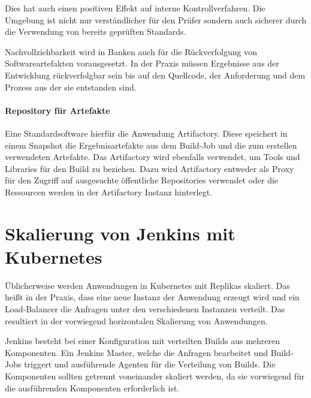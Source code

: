 Dies hat auch einen positiven Effekt auf interne Kontrollverfahren. Die Umgebung ist nicht nur verständlicher für den Prüfer sondern auch sicherer durch die Verwendung von bereits geprüften Standards.

Nachvollziehbarkeit wird in Banken auch für die Rückverfolgung von Softwareartefakten vorausgesetzt. In der Praxis müssen Ergebnisse aus der Entwicklung rückverfolgbar sein bis auf den Quellcode, der Anforderung und dem Prozess aus der sie entstanden sind.

\paragraph{Repository für Artefakte}
Eine Standardsoftware hierfür die Anwendung Artifactory. Diese speichert in einem Snapshot die Ergebnisartefakte aus dem Build-Job und die zum erstellen verwendeten Artefakte. Das Artifactory wird ebenfalls verwendet, um Tools und Libraries für den Build zu beziehen. Dazu wird Artifactory entweder als Proxy für den Zugriff auf ausgesuchte öffentliche Repositories verwendet oder die Ressourcen werden in der Artifactory Instanz hinterlegt.

\section{Skalierung von Jenkins mit Kubernetes}
\label{jenkins:skalierung}
Üblicherweise werden Anwendungen in Kubernetes mit Replikas skaliert. Das heißt in der Praxis, dass eine neue Instanz der Anwendung erzeugt wird und ein Load-Balancer die Anfragen unter den verschiedenen Instanzen verteilt. Das resultiert in der vorwiegend horizontalen Skalierung von Anwendungen. 

Jenkins besteht bei einer Konfiguration mit verteilten Builds aus mehreren Komponenten. Ein Jenkins Master, welche die Anfragen bearbeitet und Build-Jobs triggert und ausführende Agenten für die Verteilung von Builds. Die Komponenten sollten getrennt voneinander skaliert werden, da sie vorwiegend für die ausführenden Komponenten erforderlich ist. 

